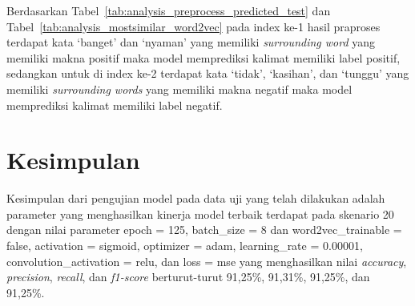 Berdasarkan Tabel~\ref{tab:analysis_preprocess_predicted_test} dan Tabel~\ref{tab:analysis_mostsimilar_word2vec}
pada index ke-1 hasil praproses terdapat kata `banget' dan `nyaman' yang memiliki \emph{surrounding word}
yang memiliki makna positif maka model memprediksi kalimat memiliki label positif, sedangkan untuk
di index ke-2 terdapat kata `tidak', `kasihan', dan `tunggu' yang memiliki \emph{surrounding words}
yang memiliki makna negatif maka model memprediksi kalimat memiliki label negatif.


\section{Kesimpulan}
Kesimpulan dari pengujian model pada data uji yang telah dilakukan adalah parameter yang menghasilkan
kinerja model terbaik terdapat pada skenario 20 dengan nilai parameter epoch = 125, batch\_size = 8 dan
word2vec\_trainable = false, activation = sigmoid, optimizer = adam, learning\_rate = 0.00001,
convolution\_activation = relu, dan loss = mse yang menghasilkan nilai \emph{accuracy},
\emph{precision}, \emph{recall}, dan \emph{f1-score} berturut-turut 91,25\%, 91,31\%, 91,25\%, dan 91,25\%.